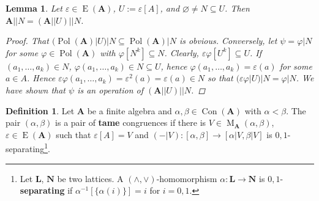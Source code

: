 \documentclass{amsart}
\theoremstyle{plain}
\newtheorem{lemma}[theorem]{Lemma}
\theoremstyle{definition}
\newtheorem{definition}[theorem]{Definition}
\theoremstyle{remark}
\def\phi{\varphi}
\def\epsilon{\varepsilon}
\DeclareMathOperator{\Con}{Con}
\DeclareMathOperator{\Pol}{Pol}
\DeclareMathOperator{\Id}{E}
\DeclareMathOperator{\M}{M}
\begin{document}
\begin{lemma}
    \label{lemma_ex}
    Let $\epsilon \in \Id(\mathbf{A})$, $U:=\epsilon[A]$, and $\varnothing \neq N \subseteq U$.  
    Then $\mathbf{A}||N = (\mathbf{A}||U)||N$. 
    \begin{proof}
        That $(\Pol(\mathbf{A})|U)|N \subseteq \Pol(\mathbf{A})|N$ is obvious. 
        Conversely, let $\psi=\phi|N$ for some $\phi \in \Pol(\mathbf{A})$ with $\phi[N^k] \subseteq N$. 
        Clearly, $\epsilon \phi [U^k] \subseteq U$. 
        If $(a_1, \ldots, a_k) \in N$, $\phi(a_1, \ldots, a_k) \in N \subseteq U$, hence $\phi(a_1, \ldots, a_k) = \epsilon(a)$ for some $a \in A$. 
        Hence $\epsilon \phi(a_1, \ldots, a_k) = \epsilon^2(a)=\epsilon(a) \in N$ so that $(\epsilon \phi |U )|N = \phi|N$. 
        We have shown that $\psi$ is an operation of $(\mathbf{A}||U)||N$. 
    \end{proof}
\end{lemma}

\begin{definition}
    Let $\mathbf{A}$ be a finite algebra and $\alpha, \beta \in \Con(\mathbf{A})$ with $\alpha < \beta$. 
    The pair $(\alpha, \beta)$ is a pair of \textbf{tame} congruences if there is $V \in \M_{\mathbf{A}}(\alpha, \beta)$, $\epsilon \in \Id(\mathbf{A})$ such that $\epsilon[A]=V$ and 
    $(-|V): [\alpha, \beta] \to [\alpha|V, \beta|V]$ is $0,1$-separating\footnote{Let $\mathbf{L}$, $\mathbf{N}$ be two lattices. 
    A $(\land, \lor)$-homomorphism $\alpha: \mathbf{L} \to \mathbf{N}$ is $0,1$-\textbf{separating} if $\alpha^{-1}[\{\alpha(i)\}]=i$ for $i=0,1$.}. 
\end{definition}
\end{document}
